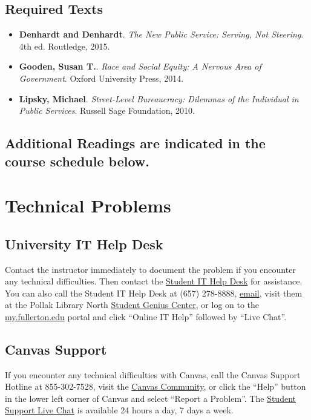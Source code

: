\documentclass[12pt, letterpaper]{article}
\begin{document}
    \subsection*{Required Texts}
    \begin{itemize}
        \item \textbf{Denhardt and Denhardt}. \textit{The New Public Service: Serving, Not Steering}. 4th ed. Routledge, 2015.
        \item \textbf{Gooden, Susan T.}. \textit{Race and Social Equity: A Nervous Area of Government}. Oxford University Press, 2014.
        \item \textbf{Lipsky, Michael}. \textit{Street-Level Bureaucracy: Dilemmas of the Individual in Public Services}. Russell Sage Foundation, 2010.
    \end{itemize}

\subsection*{Additional Readings are indicated in the course schedule below.}

\section{Technical Problems}

\subsection*{University IT Help Desk}

Contact the instructor immediately to document the problem if you encounter any technical difficulties. Then contact the \href{http://www.fullerton.edu/it/students/helpdesk/index.php}{Student IT Help Desk} for assistance. You can also call the Student IT Help Desk at (657) 278-8888, \href{mailto:StudentITHelpDesk@fullerton.edu}{email}, visit them at the Pollak Library North \href{http://www.fullerton.edu/it/students/sgc/index.php}{Student Genius Center}, or log on to the \href{http://my.fullerton.edu/}{my.fullerton.edu} portal and click ``Online IT Help'' followed by ``Live Chat''.

\subsection*{Canvas Support}

If you encounter any technical difficulties with Canvas, call the Canvas Support Hotline at 855-302-7528, visit the \href{https://community.canvaslms.com/docs/DOC-10720-67952720329}{Canvas Community}, or click the ``Help'' button in the lower left corner of Canvas and select ``Report a Problem''. The \href{https://cases.canvaslms.com/liveagentchat?chattype=student&sfid=001A000000YzcwQIAR}{Student Support Live Chat} is available 24 hours a day, 7 days a week.
\end{document}
